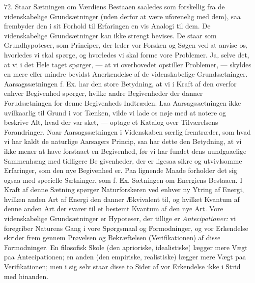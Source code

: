 \documentclass[12pt,a4paper,openany]{book}
\newcommand{\opage}[1]{\marginnote{\footnotesize\textit{[#1]}}}
\begin{document}
72. Staar Sætningen om Værdiens Bestaaen saaledes som forskellig fra de
videnskabelige Grundsætninger (uden derfor at være uforenelig med dem),
saa frembyder den i sit Forhold til Erfaringen en vis Analogi til dem.
De videnskabelige Grundsætninger kan ikke strengt bevises. De staar som
Grundhypoteser, som Principer, der leder vor Forsken og Søgen ved at
anvise os, hvorledes vi skal spørge, og hvorledes vi skal forme vore
Problemer. Ja, selve det, at vi i det Hele taget spørger, --- at vi
overhovedet opstiller Problemer, --- skyldes en mere eller mindre
bevidst Anerkendelse af de videnskabelige Grundsætninger.
Aarsagssætningen f. Ex. har den store Betydning, at vi i Kraft af den
overfor enhver Begivenhed spørger, hvilke andre Begivenheder der danner
Forudsætningen for denne Begivenheds Indtræden. Laa Aarsagssætningen
ikke uvilkaarlig til Grund i vor Tænken, vilde vi lade os nøje med at
notere og beskrive Alt, hvad der var sket, --- optage et Katalog over
Tilværelsens Forandringer. Naar Aarsagssætningen i Videnskaben særlig
fremtræder, som hvad vi har kaldt de naturlige Aarsagers Princip, saa
har dette den Betydning, at vi ikke mener at have forstaaet en
Begivenhed, før vi har fundet dens uundgaaelige Sammenhæng med tidligere
Be%
\opage{167}givenheder, der er ligesaa sikre og utvivlsomme Erfaringer,
som den nye Begivenhed er. Paa lignende Maade forholder det sig ogsaa
med specielle Sætninger, som f. Ex. Sætningen om Energiens Bestaaen. I
Kraft af denne Sætning spørger Naturforskeren ved enhver ny Ytring af
Energi, hvilken anden Art af Energi den danner Ækvivalent til, og
hvilket Kvantum af denne anden Art der svarer til et bestemt Kvantum af
den nye Art. Vore videnskabelige Grundsætninger er Hypoteser, der
tillige er \textit{Antecipationer:} vi foregriber Naturens Gang i vore
Spørgsmaal og Formodninger, og vor Erkendelse skrider frem gennem
Prøvelsen og Bekræftelsen (Verifikationen) af disse Formodninger. En
filosofisk Skole (den aprioriske, idealistiske) lægger mere Vægt paa
Antecipationen; en anden (den empiriske, realistiske) lægger mere Vægt
paa Verifikationen; men i sig selv staar disse to Sider af vor
Erkendelse ikke i Strid med hinanden.
\end{document}
